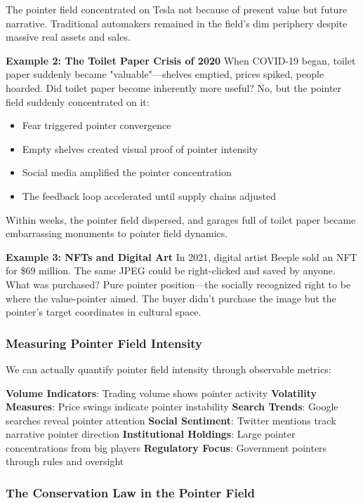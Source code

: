 \documentclass[11pt,oneside]{book}
\begin{document}
The pointer field concentrated on Tesla not because of present value but future narrative. Traditional automakers remained in the field's dim periphery despite massive real assets and sales.

\textbf{Example 2: The Toilet Paper Crisis of 2020}
When COVID-19 began, toilet paper suddenly became "valuable"—shelves emptied, prices spiked, people hoarded. Did toilet paper become inherently more useful? No, but the pointer field suddenly concentrated on it:
\begin{itemize}
\item Fear triggered pointer convergence
\item Empty shelves created visual proof of pointer intensity
\item Social media amplified the pointer concentration
\item The feedback loop accelerated until supply chains adjusted
\end{itemize}

Within weeks, the pointer field dispersed, and garages full of toilet paper became embarrassing monuments to pointer field dynamics.

\textbf{Example 3: NFTs and Digital Art}
In 2021, digital artist Beeple sold an NFT for \$69 million. The same JPEG could be right-clicked and saved by anyone. What was purchased? Pure pointer position—the socially recognized right to be where the value-pointer aimed. The buyer didn't purchase the image but the pointer's target coordinates in cultural space.

\subsubsection{Measuring Pointer Field Intensity}

We can actually quantify pointer field intensity through observable metrics:

\textbf{Volume Indicators}: Trading volume shows pointer activity
\textbf{Volatility Measures}: Price swings indicate pointer instability
\textbf{Search Trends}: Google searches reveal pointer attention
\textbf{Social Sentiment}: Twitter mentions track narrative pointer direction
\textbf{Institutional Holdings}: Large pointer concentrations from big players
\textbf{Regulatory Focus}: Government pointers through rules and oversight

\subsubsection{The Conservation Law in the Pointer Field}
\end{document}
